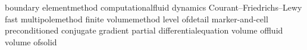 
 {boundary element}{method}
 {computational}{fluid dynamics}
 {Courant--Friedrichs--Lewy} %
 {fast multipole}{method}
 {finite volume}{method}
 {level of}{detail}
 {marker-and-cell}%
 {preconditioned conjugate gradient}
 {partial differential}{equation}
\def            \PDEs {\mbox{\PDE\qsi}}
 {volume of}{fluid}
 {volume of}{solid}


